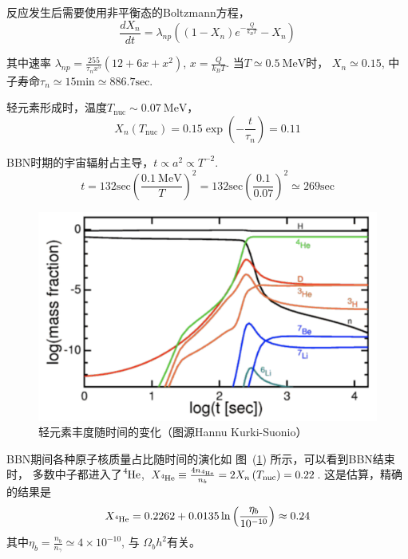 \documentclass[12pt]{ctexart}
\newcommand{\reffig}[1]{图~(\ref{#1})}
\begin{document}
反应发生后需要使用非平衡态的Boltzmann方程，
\begin{equation}
    \frac{dX_n}{dt} = \lambda_{np} \left( \left(1-X_n\right) e^{-\frac{Q }{k_B T}}-X_n\right) 
\end{equation}

其中速率 $\lambda_{np} = \frac{255}{\tau_n x^5} \left(12+6x+x^2\right) $,  
$x=\frac{Q}{k_B T}$.
当$T\simeq 0.5 \mathrm{~MeV}$时，
$X_n \simeq 0.15$,
中子寿命$\tau_n \simeq 15\mathrm{min} \simeq 886.7 \mathrm{sec}$.

轻元素形成时，温度$T_\text{nuc}\sim 0.07 \mathrm{~MeV}$， 
\begin{equation}
    X_n\left(T_\text{nuc}\right) = 0.15 \exp\left(-\frac{t }{\tau_n}\right) =0.11
\end{equation}

BBN时期的宇宙辐射占主导，$t\propto a^2\propto T^{-2}$.
\begin{equation}
    t = 132 \mathrm{sec} \left(\frac{0.1 \mathrm{~MeV}}{T}\right)^2 =   132 \mathrm{sec} \left(\frac{0.1 }{0.07}\right)^2 \simeq 269 \mathrm{sec}
\end{equation}

\begin{figure}[!hbtp]
	\centering
	\includegraphics[width=1.0\linewidth]{BBNt.png}
	\caption{轻元素丰度随时间的变化（图源Hannu Kurki-Suonio）} \label{fig:BBNt}
\end{figure}

BBN期间各种原子核质量占比随时间的演化如 \reffig{fig:BBNt}   所示，可以看到BBN结束时，
多数中子都进入了$\ce{^{4}He} $, $X_{\ce{^{4}He} } \equiv \frac{4 n_{\ce{^{4}He} }}{n_b} = 2X_n\left(T_\text{nuc}\right) =0.22$.
这是估算，精确的结果是
\begin{equation}
    X_{\ce{^{4}He} } = 0.2262+0.0135 \ln \left( \frac{\eta_b}{10^{-10}}\right) \approx 0.24
\end{equation}
其中$\eta_b = \frac{n_b}{n_\gamma} \simeq 4\times 10^{-10}$, 与 $\Omega_b h^2$有关。
\end{document}

